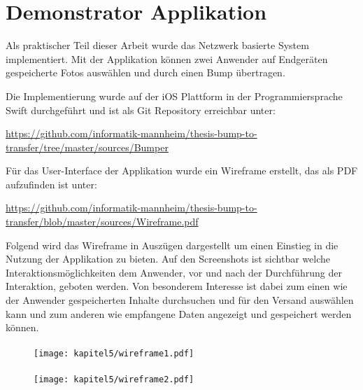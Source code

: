 \chapter{Demonstrator Applikation}
\label{Kap5}
\label{chap:Kap5}
Als praktischer Teil dieser Arbeit wurde das Netzwerk basierte System implementiert. Mit der Applikation können zwei Anwender auf Endgeräten gespeicherte Fotos auswählen und durch einen Bump übertragen.

Die Implementierung wurde auf der iOS Plattform in der Programmiersprache Swift durchgeführt und ist als Git Repository erreichbar unter:

\url{https://github.com/informatik-mannheim/thesis-bump-to-transfer/tree/master/sources/Bumper}

Für das User-Interface der Applikation wurde ein Wireframe erstellt, das als PDF aufzufinden ist unter:

\url{https://github.com/informatik-mannheim/thesis-bump-to-transfer/blob/master/sources/Wireframe.pdf}

Folgend wird das Wireframe in Auszügen dargestellt um einen Einstieg in die Nutzung der Applikation zu bieten. Auf den Screenshots ist sichtbar welche Interaktionsmöglichkeiten dem Anwender, vor und nach der Durchführung der Interaktion, geboten werden. Von besonderem Interesse ist dabei zum einen wie der Anwender gespeicherten Inhalte durchsuchen und für den Versand auswählen kann und zum anderen wie empfangene Daten angezeigt und gespeichert werden können.

\subsubsection{}
\begin{figure}[H]
  \centering
  \texttt{[image: kapitel5/wireframe1.pdf]}
\end{figure}

\subsubsection{}
\begin{figure}[H]
  \centering
  \texttt{[image: kapitel5/wireframe2.pdf]}
\end{figure}